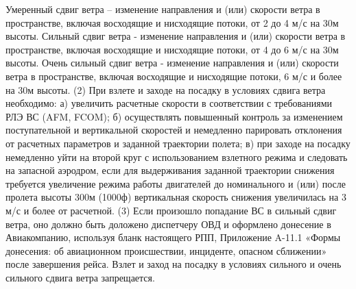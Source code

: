 Умеренный сдвиг ветра – изменение направления и (или) скорости ветра в пространстве, включая восходящие и нисходящие потоки, от 2 до 4 м/с на 30м высоты.
Сильный сдвиг ветра - изменение направления и (или) скорости ветра в пространстве, включая восходящие и нисходящие потоки, от 4 до 6 м/с на 30м высоты.
Очень сильный сдвиг ветра - изменение направления и (или) скорости ветра в пространстве, включая восходящие и нисходящие потоки, 6 м/с и более на 30м высоты.
(2) При взлете и заходе на посадку в условиях сдвига ветра необходимо:
а)	увеличить расчетные скорости в соответствии с требованиями РЛЭ ВС (AFM, FCOM);
б)	осуществлять повышенный контроль за изменением поступательной и вертикальной скоростей и немедленно парировать отклонения от расчетных параметров и заданной траектории полета;
в)	при заходе на посадку немедленно уйти на второй круг с использованием взлетного режима и следовать на запасной аэродром, если для выдерживания заданной траектории снижения требуется увеличение режима работы двигателей до номинального и (или) после пролета высоты 300м (1000ф) вертикальная скорость снижения увеличилась на 3 м/с и более от расчетной.
(3) Если произошло попадание ВС в сильный сдвиг ветра, оно должно быть доложено диспетчеру ОВД и оформлено донесение в Авиакомпанию, используя бланк настоящего РПП, Приложение A-11.1 «Формы донесения: об авиационном происшествии, инциденте, опасном сближении» после завершения рейса.
Взлет и заход на посадку в условиях сильного и очень сильного сдвига ветра запрещается.

